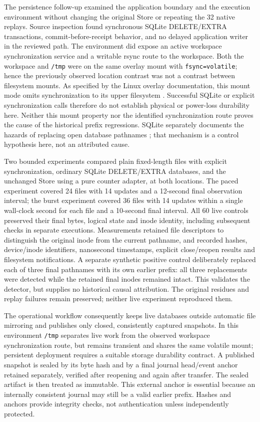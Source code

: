 \documentclass[11pt,a4paper]{article}
\theoremstyle{definition}\newtheorem{definition}[theorem]{Definition}
\begin{document}
The persistence follow-up examined the application boundary and the execution
environment without changing the original Store or repeating the 32 native
replays.  Source inspection found synchronous SQLite DELETE/EXTRA transactions,
commit-before-receipt behavior, and no delayed application writer in the
reviewed path.  The environment did expose an active workspace synchronization
service and a writable rsync route to the workspace.  Both the workspace and
\texttt{/tmp} were on the same overlay mount with
\texttt{fsync=volatile}; hence the previously observed location contrast was
not a contrast between filesystem mounts.  As specified by the Linux overlay
documentation, this mount mode omits synchronization to its upper filesystem \cite{linuxoverlay}.
Successful SQLite or explicit synchronization calls therefore do not establish
physical or power-loss durability here.  Neither this mount property nor the
identified synchronization route proves the cause of the historical prefix
regressions. SQLite separately documents the hazards of replacing open database pathnames \cite{sqlitecorruption}; that mechanism is a control hypothesis here, not an attributed cause.

Two bounded experiments compared plain fixed-length files with explicit
synchronization, ordinary SQLite DELETE/EXTRA databases, and the unchanged
Store using a pure counter adapter, at both locations.  The paced experiment
covered 24 files with 14 updates and a 12-second final observation interval;
the burst experiment covered 36 files with 14 updates within a single
wall-clock second for each file and a 10-second final interval.  All 60 live
controls preserved their final bytes, logical state and inode identity,
including subsequent checks in separate executions.  Measurements retained
file descriptors to distinguish the original inode from the current pathname,
and recorded hashes, device/inode identifiers, nanosecond timestamps, explicit
close/reopen results and filesystem notifications.  A separate synthetic
positive control deliberately replaced each of three final pathnames with its
own earlier prefix: all three replacements were detected while the retained
final inodes remained intact.  This validates the detector, but supplies no
historical causal attribution.  The original residues and replay failures
remain preserved; neither live experiment reproduced them.

The operational workflow consequently keeps live databases outside automatic
file mirroring and publishes only closed, consistently captured snapshots.
In this environment \texttt{/tmp} separates live work from the observed
workspace synchronization route, but remains transient and shares the same
volatile mount; persistent deployment requires a suitable storage durability
contract.  A published snapshot is sealed by its byte hash and by a final
journal head/event anchor retained separately, verified after reopening and
again after transfer.  The sealed artifact is then treated as immutable.
This external anchor is essential because an internally consistent journal
may still be a valid earlier prefix.  Hashes and anchors provide integrity
checks, not authentication unless independently protected.
\end{document}
